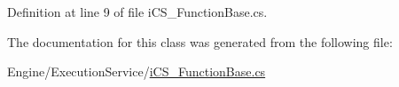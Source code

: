 Definition at line 9 of file i\+C\+S\+\_\+\+Function\+Base.\+cs.



The documentation for this class was generated from the following file\+:\begin{DoxyCompactItemize}
\item 
Engine/\+Execution\+Service/\hyperlink{i_c_s___function_base_8cs}{i\+C\+S\+\_\+\+Function\+Base.\+cs}\end{DoxyCompactItemize}
